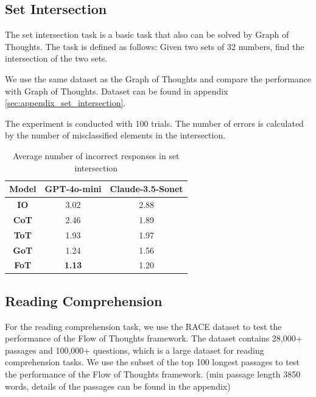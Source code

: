 \documentclass{article}
\begin{document}
\subsection{Set Intersection}

The set intersection task is a basic task that also can be solved by Graph of Thoughts. The task is defined as follows: Given two sets of 32 numbers, find the intersection of the two sets.

We use the same dataset as the Graph of Thoughts and compare the performance with Graph of Thoughts. Dataset can be found in appendix \ref{sec:appendix_set_intersection}.

The experiment is conducted with 100 trials. The number of errors is calculated by the number of misclassified elements in the intersection.

\begin{table}[h]
    \centering
    \begin{tabular}{|c|c|c|}
        \hline
        \textbf{Model} & \textbf{GPT-4o-mini} & \textbf{Claude-3.5-Sonet} \\
        \hline \hline
        \textbf{IO}    & 3.02                 & 2.88                     \\
        \textbf{CoT}   & 2.46                 & 1.89                     \\
        \textbf{ToT}   & 1.93                 & 1.97                     \\
        \textbf{GoT}   & 1.24                 & 1.56                     \\
        \textbf{FoT}   & \textbf{1.13}                 & 1.20                     \\
        \hline
    \end{tabular}
    \vspace{1em}
    \caption{Average number of incorrect responses in set intersection}
    \label{tab:set_intersection_results}
\end{table}

\subsection{Reading Comprehension}

For the reading comprehension task, we use the RACE dataset \cite{lai2017large} to test the performance of the Flow of Thoughts framework. The dataset contains 28,000+ passages and 100,000+ questions, which is a large dataset for reading comprehension tasks. We use the subset of the top 100 longest passages to test the performance of the Flow of Thoughts framework. (min passage length 3850 words, details of the passages can be found in the appendix)
\end{document}
